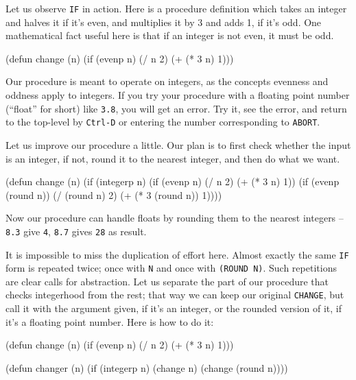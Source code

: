 \documentclass[a4paper,11pt]{article}
\begin{document}
\begin{uenum}
\item Let us observe \Verb+IF+ in action. Here is a procedure definition which takes an integer and halves it if it's even, and multiplies it by 3 and adds 1, if it's odd. One mathematical fact useful here is that if an integer is not even, it must be odd.  

\begin{lispcode}
(defun change (n)
  (if (evenp n)
    (/ n 2)
    (+ (* 3 n) 1)))
\end{lispcode}

\begin{uenumi}
\item Our procedure is meant to operate on integers, as the concepts evenness and oddness apply to integers. If you try your procedure with a floating point number (``float'' for short) like \Verb+3.8+, you will get an error. Try it, see the error, and return to the top-level by \Verb+Ctrl-D+ or entering the number corresponding to \Verb+ABORT+.    
\item Let us improve our procedure a little. Our plan is to first check whether the input is an integer, if not, round it to the nearest integer, and then do what we want. 

\begin{lispcode}
(defun change (n)
  (if (integerp n)
    (if (evenp n)
      (/ n 2)
      (+ (* 3 n) 1))
    (if (evenp (round n))
      (/ (round n) 2)
      (+ (* 3 (round n)) 1))))
\end{lispcode}

Now our procedure can handle floats by rounding them to the nearest integers -- \Verb+8.3+ give \Verb+4+, \Verb+8.7+ gives \Verb+28+ as result.

\item It is impossible to miss the duplication of effort here. Almost exactly the same \Verb+IF+ form is repeated twice; once with \Verb+N+ and once with \Verb+(ROUND N)+. Such repetitions are clear calls for abstraction. Let us separate the part of our procedure that checks integerhood from the rest; that way we can keep our original \Verb+CHANGE+, but call it with the argument given, if it's an integer, or the rounded version of it, if it's a floating point number. Here is how to do it:


\begin{lispcode}
(defun change (n)
  (if (evenp n)
    (/ n 2)
    (+ (* 3 n) 1)))

(defun changer (n)
  (if (integerp n)
    (change n)
    (change (round n))))
\end{lispcode}



\end{uenumi}
\end{uenum}
\end{document}
